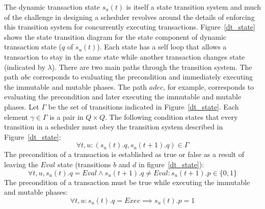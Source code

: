 The dynamic transaction state $s_u(t)$ is itself a state transition system and much of the challenge in designing a scheduler revolves around the details of enforcing this transition system for concurrently executing transactions.
Figure~\ref{dt_state} shows the state transition diagram for the state component of dynamic transaction state ($q$ of $s_u(t)$).
Each state has a self loop that allows a transaction to stay in the same state while another transaction changes state (indicated by $\lambda$).
There are two main paths through the transition system.
The path $abc$ corresponds to evaluating the precondition and immediately executing the immutable and mutable phases.
The path $adec$, for example, corresponds to evaluating the precondition and later executing the immutable and mutable phases.
Let $\Gamma$ be the set of transitions indicated in Figure~\ref{dt_state}.
Each element $\gamma \in \Gamma$ is a pair in $Q \times Q$.
The following condition states that every transition in a scheduler must obey the transition system described in Figure~\ref{dt_state}:
\begin{equation}
  \forall t, u : (s_u(t).q, s_u(t+1).q) \in \Gamma
\end{equation}
The precondition of a transaction is established as true or false as a result of leaving the $\mathit{Eval}$ state (transitions $b$ and $d$ in figure~\ref{dt_state}):
\begin{equation}
  \label{pre_establish}
  \forall t, u, s_u(t).q = \mathit{Eval} \land s_u(t+1).q \neq \mathit{Eval} : s_u(t+1).p \in \{0,1\}
\end{equation}
The precondition of a transaction must be true while executing the immutable and mutable phases:
\begin{equation}
  \label{pre_true}
  \forall t, u : s_u(t).q = \mathit{Exec} \implies s_u(t).p = 1
\end{equation}

